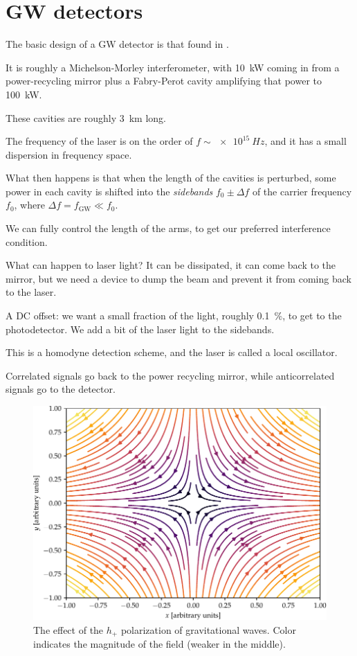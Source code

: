\documentclass[main.tex]{subfiles}
\begin{document}
\section{GW detectors}


The basic design of a GW detector is that found in \textcite[fig.\ 3]{ligoscientificcollaborationandvirgocollaborationObservationGravitationalWaves2016}. 

It is roughly a Michelson-Morley interferometer, with \SI{10}{kW} coming in
from a power-recycling mirror 
plus a Fabry-Perot cavity amplifying that power to \SI{100}{kW}. 

These cavities are roughly \SI{3}{km} long. 

The frequency of the laser is on the order of \(f \sim \SI{e15}{Hz}\), 
and it has a small dispersion in frequency space. 

What then happens is that when the length of the cavities is perturbed,
some power in each cavity is shifted into the \emph{sidebands} 
\(f_0 \pm \Delta f\) of the carrier frequency \(f_0 \), 
where \(\Delta f = f _{\text{GW}} \ll f_0 \).

We can fully control the length of the arms, 
to get our preferred interference condition. 

What can happen to laser light? It can be dissipated, 
it can come back to the mirror, but we need a device
to dump the beam and prevent it from coming back to the laser. 

A DC offset: we want a small fraction of the light, roughly \SI{.1}{\percent}, 
to get to the photodetector. 
We add a bit of the laser light to the sidebands. 

This is a homodyne detection scheme, and the laser is called a local oscillator. 

Correlated signals go back to the power recycling mirror, while
anticorrelated signals go to the detector. 

\begin{figure}[ht]
\centering
\includegraphics[width=\textwidth]{figures/polarization}
\caption{The effect of the \(h_+\) polarization of gravitational waves. Color indicates the magnitude of the field (weaker in the middle).}
\label{fig:polarization}
\end{figure}
\end{document}
